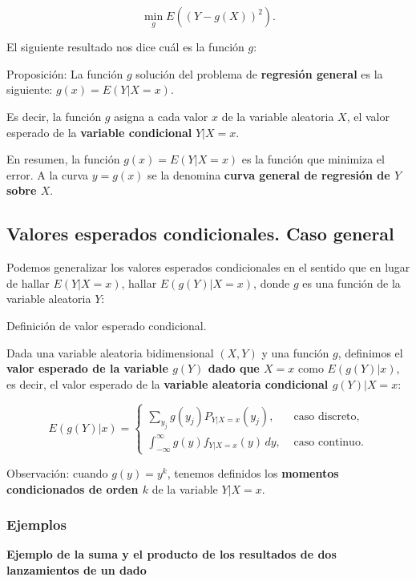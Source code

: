\documentclass[
  letterpaper,
  DIV=11,
  numbers=noendperiod]{scrreprt}
\begin{document}
\[
\min_g E\left((Y-g(X))^2\right).
\]

El siguiente resultado nos dice cuál es la función \(g\):

Proposición: La función \(g\) solución del problema de \textbf{regresión
general} es la siguiente: \(g(x)=E(Y|X=x)\).

Es decir, la función \(g\) asigna a cada valor \(x\) de la variable
aleatoria \(X\), el valor esperado de la \textbf{variable condicional}
\(Y|X=x\).

En resumen, la función \(g(x)=E(Y|X=x)\) es la función que minimiza el
error. A la curva \(y=g(x)\) se la denomina \textbf{curva general de
regresión de \(Y\) sobre \(X\)}.

\hypertarget{valores-esperados-condicionales.-caso-general}{%
\subsection{Valores esperados condicionales. Caso
general}\label{valores-esperados-condicionales.-caso-general}}

Podemos generalizar los valores esperados condicionales en el sentido
que en lugar de hallar \(E(Y|X=x)\), hallar \(E(g(Y)|X=x)\), donde \(g\)
es una función de la variable aleatoria \(Y\):

Definición de valor esperado condicional.

Dada una variable aleatoria bidimensional \((X,Y)\) y una función \(g\),
definimos el \textbf{valor esperado de la variable \(g(Y)\) dado que
\(X=x\)} como \(E(g(Y)|x)\), es decir, el valor esperado de la
\textbf{variable aleatoria condicional \(g(Y)|X=x\)}:

\[
E(g(Y)|x)=\begin{cases}
\sum_{y_j} g(y_j) P_{Y|X=x}(y_j), & \mbox{ caso discreto,}\\
\int_{-\infty}^\infty g(y) f_{Y|X=x}(y)\,dy, & \mbox{ caso continuo.}
\end{cases}
\]

Observación: cuando \(g(y)=y^k\), tenemos definidos los \textbf{momentos
condicionados de orden \(k\)} de la variable \(Y|X=x\).

\hypertarget{ejemplos-8}{%
\subsubsection{Ejemplos}\label{ejemplos-8}}

\textbf{Ejemplo de la suma y el producto de los resultados de dos
lanzamientos de un dado}
\end{document}
